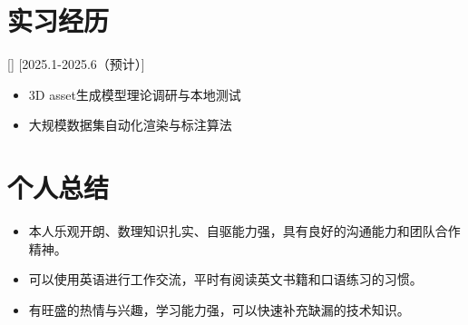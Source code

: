 \documentclass{resume}
\begin{document}
\section{实习经历}
[]
[2025.1-2025.6（预计）]
\begin{itemize}
  \item 3D asset生成模型理论调研与本地测试
  \item 大规模数据集自动化渲染与标注算法
\end{itemize}


\section{个人总结}

\begin{itemize}
  \item 本人乐观开朗、数理知识扎实、自驱能力强，具有良好的沟通能力和团队合作精神。
  \item 可以使用英语进行工作交流，平时有阅读英文书籍和口语练习的习惯。
  \item 有旺盛的热情与兴趣，学习能力强，可以快速补充缺漏的技术知识。
\end{itemize}
\end{document}
